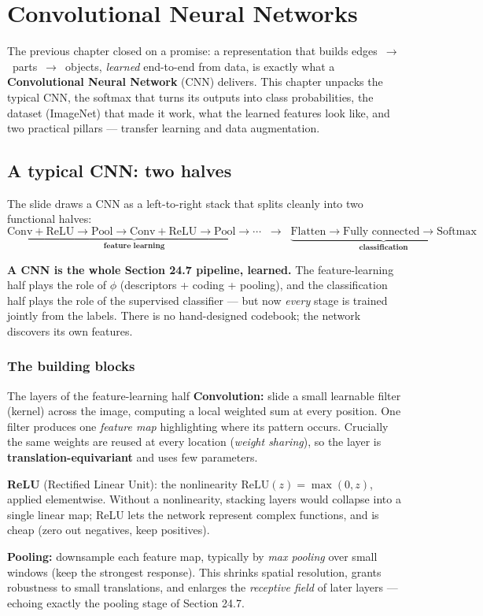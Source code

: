 \documentclass{report}
\begin{document}
\section{Convolutional Neural Networks}

The previous chapter closed on a promise: a representation that builds
edges~$\to$~parts~$\to$~objects, \emph{learned} end-to-end from data, is exactly
what a \textbf{Convolutional Neural Network} (CNN) delivers. This chapter
unpacks the typical CNN, the softmax that turns its outputs into class
probabilities, the dataset (ImageNet) that made it work, what the learned
features look like, and two practical pillars --- transfer learning and data
augmentation.

\subsection{A typical CNN: two halves}

The slide draws a CNN as a left-to-right stack that splits cleanly into two
functional halves:
\[
\underbrace{\text{Conv}+\text{ReLU} \to \text{Pool} \to \text{Conv}+\text{ReLU}
\to \text{Pool} \to \cdots}_{\textbf{feature learning}}
\;\;\to\;\;
\underbrace{\text{Flatten} \to \text{Fully connected} \to \text{Softmax}}_{\textbf{classification}}
\]

\begin{keybox}
\textbf{A CNN is the whole Section 24.7 pipeline, learned.} The feature-learning
half plays the role of $\phi$ (descriptors + coding + pooling), and the
classification half plays the role of the supervised classifier --- but now
\emph{every} stage is trained jointly from the labels. There is no
hand-designed codebook; the network discovers its own features.
\end{keybox}

\subsubsection{The building blocks}

\begin{defbox}{The layers of the feature-learning half}
\textbf{Convolution:} slide a small learnable filter (kernel) across the image,
computing a local weighted sum at every position. One filter produces one
\emph{feature map} highlighting where its pattern occurs. Crucially the same
weights are reused at every location (\emph{weight sharing}), so the layer is
\textbf{translation-equivariant} and uses few parameters.

\medskip
\textbf{ReLU} (Rectified Linear Unit): the nonlinearity $\mathrm{ReLU}(z) =
\max(0,z)$, applied elementwise. Without a nonlinearity, stacking layers would
collapse into a single linear map; ReLU lets the network represent complex
functions, and is cheap (zero out negatives, keep positives).

\medskip
\textbf{Pooling:} downsample each feature map, typically by \emph{max pooling}
over small windows (keep the strongest response). This shrinks spatial
resolution, grants robustness to small translations, and enlarges the
\emph{receptive field} of later layers --- echoing exactly the pooling stage of
Section 24.7.
\end{defbox}
\end{document}
